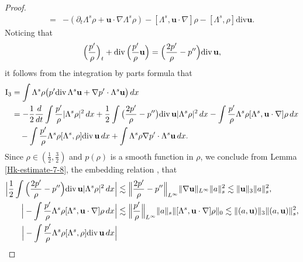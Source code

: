\documentclass[12pt, reqno]{amsart}
\numberwithin{equation}{section}
\numberwithin{equation}{section}
\def\div{ \hbox{\rm div}\,  }
\numberwithin{equation}{section}
\numberwithin{equation}{section}
\theoremstyle{remark}
\def\div{ \hbox{\rm div}\,  }
\def\u{ \mathbf{u} }
\begin{document}
\begin{proof}
\begin{align*}
  =&-(\partial_t\Lambda^s\rho+\u\cdot\nabla\Lambda^s\rho)-[\Lambda^s,\u\cdot\nabla]\rho-[\Lambda^s,\rho]\text{div}\u.
\end{align*}
Noticing that
$$
\Big(\frac{p'}{\rho}\Big)_t+\div \Big(\frac{p'}{\rho}\u\Big)=\Big(\frac{2p'}{\rho}-p''\Big)\div \u,
$$
it follows from the integration by parts formula that
\begin{equation*}\begin{split}
\textrm{I}_3&=\int\Lambda^s\rho\big(p'\div \Lambda^s\u+\nabla p'\cdot \Lambda^s\u\big)\,dx\\
&=-\frac12\frac{d}{dt}\int\frac{p'}{\rho}|\Lambda^s\rho|^2\,dx+\frac12\int\big(\frac{2p'}{\rho}-p''\big)\div \u|\Lambda^s\rho|^2\,dx
-\int\frac{p'}{\rho}\Lambda^s\rho[\Lambda^s,\u\cdot\nabla]\rho \,dx
\\&\quad-\int\frac{p'}{\rho}\Lambda^s\rho[\Lambda^s,\rho]\div \u \,dx+\int\Lambda^s\rho\nabla p'\cdot\Lambda^s\u \,dx.
\end{split}\end{equation*}
Since $\rho\in(\frac12,\frac32)$ and $p(\rho)$ is a smooth function in $\rho$, we conclude  from Lemma \ref{Hk-estimate-7-8}, the embedding relation , that
\begin{equation*}\begin{split}
\Big|\frac12\int\Big(\frac{2p'}{\rho}-p''\Big)\div \u|\Lambda^s\rho|^2\,dx\Big|
&\lesssim\Big\|\frac{2p'}{\rho}-p''\Big\|_{L^\infty}\|\nabla\u\|_{L^\infty}\|a\|^2_s
\lesssim\|\u\|_{3}\|a\|^2_s,\\
%
%
\Big|-\int\frac{p'}{\rho}\Lambda^s\rho[\Lambda^s,\u\cdot\nabla]\rho \,dx\Big|&\lesssim\Big\|\frac{p'}{\rho}\Big\|_{L^\infty}\|a\|_s\|[\Lambda^s,\u\cdot\nabla]\rho\|_0
\lesssim\|(a,\u)\|_{3}\|(a,\u)\|^2_s,\\
%
%
\Big|-\int\frac{p'}{\rho}\Lambda^s\rho[\Lambda^s,\rho]\div \u \,dx\Big|

\end{split}
\end{equation*}
\end{proof}
\end{document}

